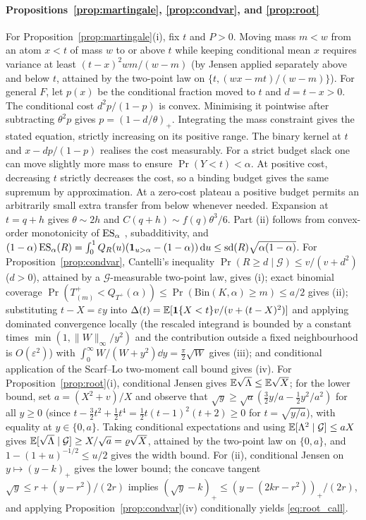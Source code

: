 \paragraph{Propositions~\ref{prop:martingale}, \ref{prop:condvar}, and \ref{prop:root}}
For Proposition~\ref{prop:martingale}(i), fix $t$ and $P>0$. Moving mass $m<w$ from an atom $x<t$ of
mass $w$ to or above $t$ while keeping conditional mean $x$ requires variance at least
$(t-x)^2 wm/(w-m)$ (by Jensen applied separately above and below $t$, attained by the two-point law on
$\{t,(wx-mt)/(w-m)\}$). For general $F$, let $p(x)$ be the conditional fraction moved to $t$ and $d=t-x>0$.
The conditional cost $d^2p/(1-p)$ is convex. Minimising it pointwise after subtracting
$\theta^2p$ gives $p=(1-d/\theta)_+$. Integrating the mass constraint gives the stated
equation, strictly increasing on its positive range. The binary kernel at $t$ and
$x-dp/(1-p)$ realises the cost measurably. For a strict budget slack one can move slightly
more mass to ensure $\Pr(Y<t)<\alpha$. At positive cost, decreasing $t$ strictly decreases
the cost, so a binding budget gives the same supremum by approximation. At a zero-cost
plateau a positive budget permits an arbitrarily small extra transfer from below whenever
needed. Expansion at $t=q+h$ gives $\theta\sim2h$ and
$C(q+h)\sim f(q)\theta^3/6$. Part (ii) follows
from convex-order monotonicity of $\operatorname{ES}_\alpha$ \citep{Strassen1965}, subadditivity, and
$(1-\alpha)\operatorname{ES}_\alpha(R)=\int_0^1 Q_R(u)(\mathbf{1}_{u>\alpha}-(1-\alpha))\,\mathrm{d} u\le\mathrm{sd}(R)\sqrt{\alpha(1-\alpha)}$.
For Proposition~\ref{prop:condvar}, Cantelli's inequality $\Pr(R\ge d\mid\mathcal{G})\le v/(v+d^2)$ ($d>0$),
attained by a $\mathcal{G}$-measurable two-point law, gives (i); exact binomial coverage
$\Pr(T^+_{(m)}<Q_{T^+}(\alpha))\le\Pr(\mathrm{Bin}(K,\alpha)\ge m)\le a/2$ gives (ii); substituting
$t-X=\varepsilon y$ into $\Delta(t)=\mathbb{E}[\mathbf{1}\{X<t\}v/(v+(t-X)^2)]$ and applying dominated convergence
locally (the rescaled integrand is bounded by a constant times $\min(1,\|W\|_\infty/y^2)$ and the contribution outside a fixed neighbourhood is $O(\varepsilon^2)$) with $\int_0^\infty W/(W+y^2)\dd y=\tfrac{\pi}{2}\sqrt{W}$ gives (iii); and conditional application of the
Scarf--Lo two-moment call bound \citep{Scarf1957,Lo1987} gives (iv).
For Proposition~\ref{prop:root}(i), conditional Jensen gives $\mathbb{E}\sqrt{\Lambda}\le\mathbb{E}\sqrt{X}$; for the lower
bound, set $a=(X^2+v)/X$ and observe that $\sqrt{y}\ge\sqrt{a}(\tfrac32 y/a-\tfrac12 y^2/a^2)$ for all
$y\ge0$ (since $t-\tfrac32 t^2+\tfrac12 t^4=\tfrac12 t(t-1)^2(t+2)\ge0$ for $t=\sqrt{y/a}$), with equality
at $y\in\{0,a\}$. Taking conditional expectations and using $\mathbb{E}[\Lambda^2\mid\mathcal{G}]\le aX$ gives
$\mathbb{E}[\sqrt{\Lambda}\mid\mathcal{G}]\ge X/\sqrt{a}=\varrho\sqrt{X}$, attained by the two-point law on
$\{0,a\}$, and $1-(1+u)^{-1/2}\le u/2$ gives the width bound. For (ii), conditional Jensen on
$y\mapsto(y-k)_+$ gives the lower bound; the concave tangent $\sqrt{y}\le r+(y-r^2)/(2r)$ implies
$(\sqrt{y}-k)_+\le(y-(2kr-r^2))_+/(2r)$, and applying Proposition~\ref{prop:condvar}(iv) conditionally
yields \eqref{eq:root_call}.

